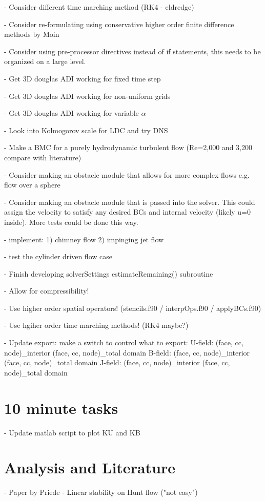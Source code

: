\documentclass[11pt]{article}
\begin{document}
- Consider different time marching method (RK4 - eldredge)

- Consider re-formulating using conservative higher order finite difference methods by Moin

- Consider using pre-processor directives instead of if statements, this needs to be organized on a large level.

- Get 3D douglas ADI working for fixed time step

- Get 3D douglas ADI working for non-uniform grids

- Get 3D douglas ADI working for variable $\alpha$

- Look into Kolmogorov scale for LDC and try DNS

- Make a BMC for a purely hydrodynamic turbulent flow (Re=2,000 and 3,200 compare with literature)

- Consider making an obstacle module that allows for more complex flows
e.g. flow over a sphere

- Consider making an obstacle module that is passed into the solver.
This could assign the velocity to satisfy any desired BCs and internal
velocity (likely u=0 inside). More tests could be done this way.

- implement: 1) chimney flow 2) impinging jet flow

- test the cylinder driven flow case

- Finish developing solverSettings estimateRemaining() subroutine

- Allow for compressibility!

- Use higher order spatial operators! (stencils.f90 / interpOps.f90 / applyBCs.f90)

- Use hgiher order time marching methods! (RK4 maybe?)

- Update export: make a switch to control what to export:
      U-field: (face, cc, node)\_interior (face, cc, node)\_total domain
      B-field: (face, cc, node)\_interior (face, cc, node)\_total domain
      J-field: (face, cc, node)\_interior (face, cc, node)\_total domain

\section{10 minute tasks}
- Update matlab script to plot KU and KB


\section{Analysis and Literature}
- Paper by Priede - Linear stability on Hunt flow ("not easy")
\end{document}
